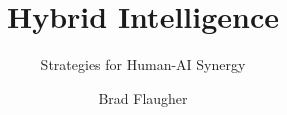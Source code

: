 \documentclass[
    letterpaper, %
    fontsize=10pt, %
    twoside=false, %
	numbers=noenddot, %
]{kaobook}
\begin{document}



%



\titlehead{}
\subject{}

\title[Hybrid Intelligence]{Hybrid Intelligence}
\subtitle{Strategies for Human-AI Synergy}

\author[Brad Flaugher]{Brad Flaugher}

\date{}

\publishers{\texttt{[image: publogo]}}


\frontmatter %



\end{document}
